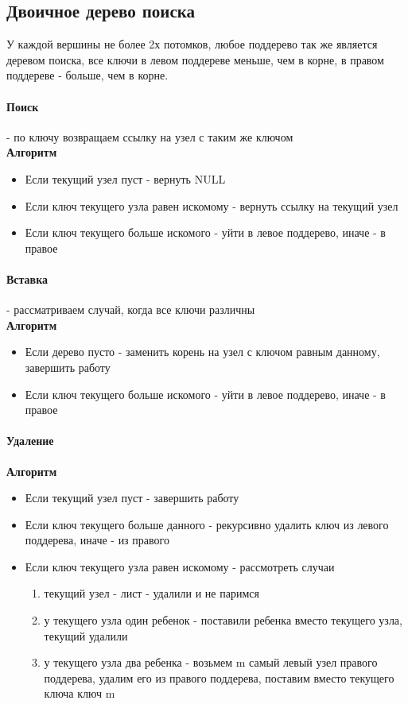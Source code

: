 \documentclass[a4paper,10pt]{article}
\begin{document}
\subsection{Двоичное дерево поиска}
У каждой вершины не более 2х потомков, любое поддерево так же является деревом поиска, все ключи в левом поддереве меньше, чем в корне, в правом поддереве - больше, чем в корне. 
\paragraph{Поиск} - по ключу возвращаем ссылку на узел с таким же ключом\\
\textbf{Алгоритм} \\
\begin{itemize}
	\item Если текущий узел пуст - вернуть NULL
	\item Если ключ текущего узла равен искомому - вернуть ссылку на текущий узел 
	\item Если ключ текущего больше искомого - уйти в левое поддерево, иначе - в правое
\end{itemize}
\paragraph{Вставка} - рассматриваем случай, когда все ключи различны\\
\textbf{Алгоритм}\\
\begin{itemize}
	\item Если дерево пусто - заменить корень на узел с ключом равным данному, завершить работу
	\item Если ключ текущего больше искомого - уйти в левое поддерево, иначе - в правое
\end{itemize}
\paragraph{Удаление}
\textbf{Алгоритм}
\begin{itemize}
	\item Если текущий узел пуст - завершить работу
	\item Если ключ текущего больше данного - рекурсивно удалить ключ из левого поддерева, иначе - из правого
	\item Если ключ текущего узла равен искомому - рассмотреть случаи 
	\begin{enumerate}
		\item текущий узел - лист - удалили и не паримся
		\item у текущего узла один ребенок - поставили ребенка вместо текущего узла, текущий удалили
		\item у текущего узла два ребенка - возьмем m самый левый узел правого поддерева, удалим его из правого поддерева, поставим вместо текущего ключа ключ m
	\end{enumerate}
\end{itemize}
\end{document}
